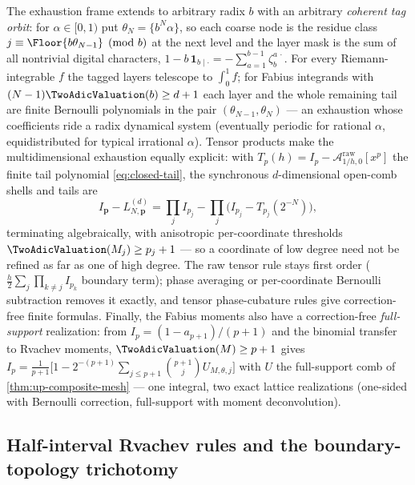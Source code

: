 \documentclass[11pt,oneside]{article}
\numberwithin{equation}{section}
\theoremstyle{definition}
\theoremstyle{remark}
\begin{document}
The exhaustion frame extends to arbitrary radix $b$ with an arbitrary
\emph{coherent tag orbit}: for $\alpha\in[0,1)$ put
$\theta_N=\{b^{N}\alpha\}$, so each coarse node is the residue class
$j\equiv\Floor{b\theta_{N-1}}\pmod b$ at the next level and the layer
mask is the sum of all nontrivial digital characters,
$1-b\,\mathbf 1_{b\mid\cdot}=-\sum_{a=1}^{b-1}\zeta_b^{a\,\cdot}$.
For every Riemann-integrable $f$ the tagged layers telescope to
$\int_0^1f$; for Fabius integrands with
$(N-1)\TwoAdicValuation(b)\ge d+1$ each layer and the whole remaining tail are
finite Bernoulli polynomials in the pair
$(\theta_{N-1},\theta_N)$ --- an exhaustion whose coefficients ride a
radix dynamical system (eventually periodic for rational $\alpha$,
equidistributed for typical irrational $\alpha$).  Tensor products
make the multidimensional exhaustion equally explicit: with
$T_p(h)=I_p-\mathcal A^{\mathrm{raw}}_{1/h,0}[x^{p}]$ the finite tail
polynomial \eqref{eq:closed-tail}, the synchronous $d$-dimensional
open-comb shells and tails are
\begin{equation}
 I_{\bm p}-L^{(d)}_{N,\bm p}
 =\prod_{j}I_{p_j}-\prod_{j}\bigl(I_{p_j}-T_{p_j}(2^{-N})\bigr),
 \label{eq:tensor-tail}
\end{equation}
terminating algebraically, with anisotropic per-coordinate
thresholds $\TwoAdicValuation(M_j)\ge p_j+1$ --- so a coordinate of low degree
need not be refined as far as one of high degree.  The raw tensor
rule stays first order ($\tfrac h2\sum_j\prod_{k\ne j}I_{p_k}$
boundary term); phase averaging or per-coordinate Bernoulli
subtraction removes it exactly, and tensor phase-cubature rules give
correction-free finite formulas.  Finally, the Fabius moments also
have a correction-free \emph{full-support} realization: from
$I_p=(1-a_{p+1})/(p+1)$ and the binomial transfer to Rvachev moments,
$\TwoAdicValuation(M)\ge p+1$ gives
$I_p=\tfrac1{p+1}\bigl[1-2^{-(p+1)}\sum_{j\le p+1}\binom{p+1}j
U_{M,\theta,j}\bigr]$ with $U$ the full-support comb of
\cref{thm:up-composite-mesh} --- one integral, two exact lattice
realizations (one-sided with Bernoulli correction, full-support with
moment deconvolution).

\subsection{Half-interval Rvachev rules and the boundary-topology
trichotomy}
\end{document}
